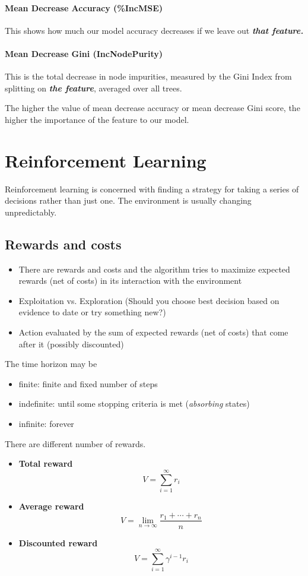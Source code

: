 \paragraph{Mean Decrease Accuracy (\%IncMSE)}
This shows how much our model accuracy decreases if we leave out \textit{\textbf{that feature.}}

\paragraph{Mean Decrease Gini (IncNodePurity)}
This is the total decrease in node impurities, measured by the Gini Index from splitting on \textit{\textbf{the feature}}, averaged over all trees.

The higher the value of mean decrease accuracy or mean decrease Gini score, the higher the importance of the feature to our model.

\section{Reinforcement Learning}

Reinforcement learning is concerned with finding a strategy for taking a series of decisions rather than just one.
The environment is usually changing unpredictably.

\subsection{Rewards and costs}

\begin{itemize}
    \item There are rewards and costs and the algorithm tries to maximize expected rewards (net of costs) in its interaction with the environment 
    \item Exploitation vs. Exploration (Should you choose best decision based on evidence to date or try something new?)
    \item Action evaluated by the sum of expected rewards (net of costs) that come after it (possibly discounted)
\end{itemize}

The time horizon may be
\begin{itemize}
    \item finite: finite and fixed number of steps
    \item indefinite: until some stopping criteria is met (\emph{absorbing} states)
    \item infinite: forever
\end{itemize}
There are different number of rewards.
\begin{itemize}
    \item \textbf{Total reward}
    \[
        V = \sum_{i=1}^{\infty} r_{i} 
    \]
    \item \textbf{Average reward}
    \[
        V = \lim_{n \to \infty} \frac{r_{1} + \cdots + r_{n}}{n}
    \]
    \item \textbf{Discounted reward}
    \[
        V = \sum_{i=1}^{\infty} \gamma ^{i-1} r_{i}  
    \]
\end{itemize}

